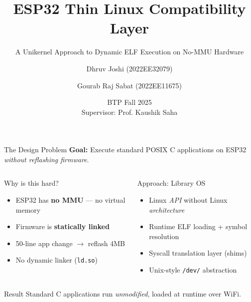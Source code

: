 \documentclass[aspectratio=169, 10pt]{beamer}
\title[ESP32 Thin Linux]{ESP32 Thin Linux Compatibility Layer}
\subtitle{A Unikernel Approach to Dynamic ELF Execution on No-MMU Hardware}
\author[Joshi \& Sabat]{Dhruv Joshi (2022EE32079) \and Gourab Raj Sabat (2022EE11675)}
\institute[IIT Delhi]{Department of Electrical Engineering \\ Indian Institute of Technology Delhi}
\date{BTP Fall 2025 \\ Supervisor: Prof. Kaushik Saha}
\begin{document}
\begin{frame}
\titlepage
\end{frame}

\begin{frame}{The Design Problem}
    \textbf{Goal:} Execute standard POSIX C applications on ESP32 \textit{without reflashing firmware}.

    \vspace{0.2cm}
    \begin{columns}[T]
        \begin{block}{Why is this hard?}
            \begin{itemize}
                \item ESP32 has \textbf{no MMU} --- no virtual memory
                \item Firmware is \textbf{statically linked}
                \item 50-line app change $\to$ reflash 4MB
                \item No dynamic linker (\texttt{ld.so})
            \end{itemize}
        \end{block}

        \begin{block}{Approach: Library OS}
            \begin{itemize}
                \item Linux \textit{API} without Linux \textit{architecture}
                \item Runtime ELF loading + symbol resolution
                \item Syscall translation layer (shims)
                \item Unix-style \texttt{/dev/} abstraction
            \end{itemize}
        \end{block}
    \end{columns}

    \vspace{0.3cm}
    \begin{alertblock}{Result}
        \centering
        Standard C applications run \textit{unmodified}, loaded at runtime over WiFi.
    \end{alertblock}
\end{frame}
\end{document}

